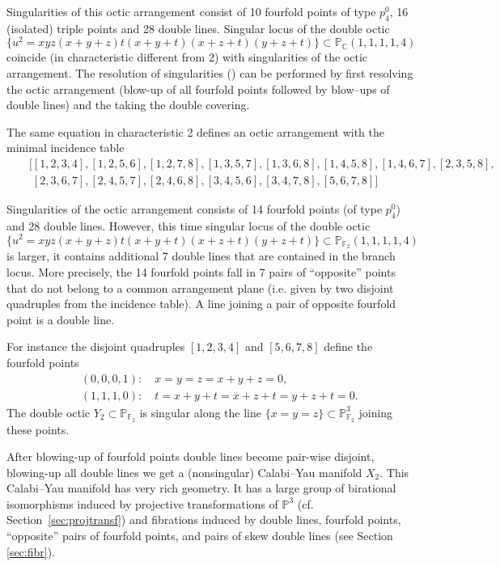\documentclass[12pt]{amsart}
\theoremstyle{plain}
\theoremstyle{remark}
\theoremstyle{definition}
\newcommand{\PP}{\mathbb P}
\newcommand\CC{{\mathbb C}}
\numberwithin{table}{section}
\begin{document}
Singularities of this octic arrangement consist of 10 fourfold points of type $p_{4}^{0}$, 16 (isolated) triple points and 28 double lines. Singular locus of the double octic
\[\{u^{2} = xyz(x+y+z)t(x+y+t)(x+z+t)(y+z+t)\}\subset \PP_{\CC}(1,1,1,1,4)
\]
coincide (in characteristic different from 2) with singularities of the octic arrangement. The resolution of singularities (\cite{CSz}) can be performed by first resolving the octic arrangement (blow-up of all fourfold points followed by blow--ups of double lines) and the taking the double covering.

The same equation in characteristic 2 defines an octic arrangement with the minimal incidence table
\begin{eqnarray*}
	&&[[1, 2, 3, 4], [1, 2, 5, 6],[1, 2, 7, 8], [1, 3, 5, 7], [1, 3, 6, 8], [1, 4, 5, 8], [1, 4, 6, 7], [2, 3, 5, 8],\\
	&&\phantom{[}[2, 3, 6, 7], [2, 4, 5, 7], [2, 4, 6, 8], [3, 4, 5, 6], [3, 4, 7, 8], [5, 6, 7, 8]]
\end{eqnarray*}

Singularities of the octic arrangement consists of 14 fourfold points (of type $p_{4}^{0}$) and 28 double lines. However, this time singular locus of the double octic
\[\{u^{2} = xyz(x+y+z)t(x+y+t)(x+z+t)(y+z+t)\}\subset \PP_{\mathbb F_{2}}(1,1,1,1,4)
\]
is larger, it contains additional 7 double lines that are contained in the branch locus. More precisely, the 14 fourfold points fall in 7 pairs of ``opposite'' points that do not belong to a common arrangement plane (i.e. given by two disjoint quadruples from the incidence table). A line joining a pair of opposite fourfold point is a double line.

For instance the disjoint quadruples $[1,2,3,4]$ and $[5,6,7,8]$ define the fourfold points
\begin{eqnarray*}
&&(0,0,0,1):\quad x=y=z=x+y+z=0,\\
&&(1,1,1,0):\quad t=x+y+t=x+z+t=y+z+t=0.
\end{eqnarray*}
The double octic  $Y_{2}\subset\PP_{\mathbb F_{2}}$ is singular along the line $\{x=y=z\}\subset \PP_{\mathbb F_{2}}^{3}$ joining these points.

After blowing-up of fourfold points double lines become pair-wise disjoint, blowing-up all double lines we get a (nonsingular) Calabi--Yau manifold $X_{2}$.
This Calabi--Yau manifold has very rich geometry. It has a large group of birational isomorphisms induced by projective transformations of $\PP^{3}$ (cf. Section~\ref{sec:projtransf}) and fibrations induced by  double lines, fourfold points, ``opposite'' pairs of fourfold points, and pairs of skew double lines  (see Section \ref{sec:fibr}).
\end{document}

